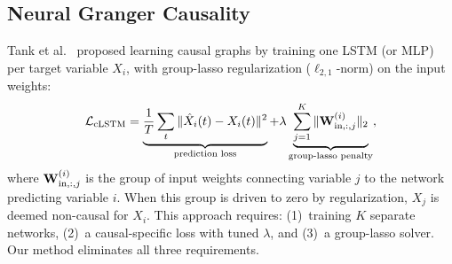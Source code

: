 \subsection{Neural Granger Causality}

Tank et al.~\citep{tank2021neural} proposed learning causal graphs by
training one LSTM (or MLP) per target variable $X_i$, with group-lasso
regularization ($\ell_{2,1}$-norm) on the input weights:
\begin{equation}
    \mathcal{L}_{\text{cLSTM}} = \underbrace{\frac{1}{T} \sum_t
    \|\hat{X}_i(t) - X_i(t)\|^2}_{\text{prediction loss}} +
    \lambda \underbrace{\sum_{j=1}^{K}
    \|\mathbf{W}^{(i)}_{\text{in}, :, j}\|_2}_{\text{group-lasso penalty}},
    \label{eq:clstm_loss}
\end{equation}
where $\mathbf{W}^{(i)}_{\text{in}, :, j}$ is the group of input weights
connecting variable $j$ to the network predicting variable $i$. When
this group is driven to zero by regularization, $X_j$ is deemed
non-causal for $X_i$. This approach requires: (1)~training $K$ separate
networks, (2)~a causal-specific loss with tuned $\lambda$, and (3)~a
group-lasso solver. Our method eliminates all three requirements.
